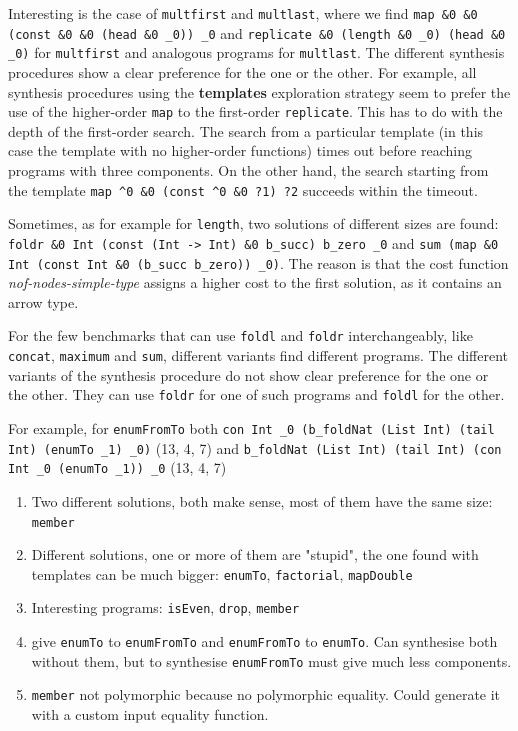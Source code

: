 Interesting is the case of \lstinline?multfirst? and \lstinline?multlast?, where we find \lstinline?map &0 &0 (const &0 &0 (head &0 _0)) _0? and \lstinline?replicate &0 (length &0 _0) (head &0 _0)? for \lstinline?multfirst? and analogous programs for \lstinline?multlast?. The different synthesis procedures show a clear preference for the one or the other. For example, all synthesis procedures using the \textbf{templates} exploration strategy seem to prefer the use of the higher-order \lstinline?map? to the first-order \lstinline?replicate?. This has to do with the depth of the first-order search. The search from a particular template (in this case the template with no higher-order functions) times out before reaching programs with three components. On the other hand, the search starting from the template \lstinline!map ^0 &0 (const ^0 &0 ?1) ?2! succeeds within the timeout.

Sometimes, as for example for \lstinline?length?, two solutions of different sizes are found: \lstinline?foldr &0 Int (const (Int -> Int) &0 b_succ) b_zero _0? and \lstinline?sum (map &0 Int (const Int &0 (b_succ b_zero)) _0)?. The reason is that the cost function \textit{nof-nodes-simple-type} assigns a higher cost to the first solution, as it contains an arrow type.

For the few benchmarks that can use \lstinline?foldl? and \lstinline?foldr? interchangeably, like \lstinline?concat?, \lstinline?maximum? and \lstinline?sum?, different variants find different programs. The different variants of the synthesis procedure do not show clear preference for the one or the other. They can use \lstinline?foldr? for one of such programs and \lstinline?foldl? for the other.


For example, for \lstinline?enumFromTo? both \lstinline?con Int _0 (b_foldNat (List Int) (tail Int) (enumTo _1) _0)? (13, 4, 7) and \lstinline?b_foldNat (List Int) (tail Int) (con Int _0 (enumTo _1)) _0? (13, 4, 7)





\begin{enumerate}
\item Two different solutions, both make sense, most of them have the same size: \lstinline?member?
\item Different solutions, one or more of them are "stupid", the one found with templates can be much bigger: \lstinline?enumTo?, \lstinline?factorial?, \lstinline?mapDouble?
\item Interesting programs: \lstinline?isEven?, \lstinline?drop?, \lstinline?member?
\item give \lstinline?enumTo? to \lstinline?enumFromTo? and \lstinline?enumFromTo? to \lstinline?enumTo?. Can synthesise both without them, but to synthesise \lstinline?enumFromTo? must give much less components.
\item \lstinline?member? not polymorphic because no polymorphic equality. Could generate it with a custom input equality function.
\end{enumerate}

